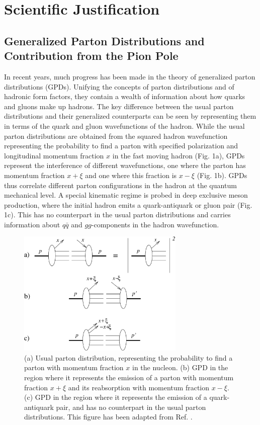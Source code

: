 \section{Scientific Justification}


\subsection{Generalized Parton Distributions and Contribution from the Pion
  Pole}

In recent years, much progress has been made in the theory of generalized
parton distributions (GPDs).  Unifying the concepts of parton distributions and
of hadronic form factors, they contain a wealth of information about how quarks
and gluons make up hadrons. The key difference between the usual parton
distributions and their generalized counterparts can be seen by representing
them in terms of the quark and gluon wavefunctions of the hadron.  While the
usual parton distributions are obtained from the squared hadron wavefunction
representing the probability to find a parton with specified polarization and
longitudinal momentum fraction $x$ in the fast moving hadron (Fig. 1a), GPDs
represent the interference of different wavefunctions, one where the parton has
momentum fraction $x+\xi$ and one where this fraction is $x-\xi$ (Fig. 1b).
GPDs thus correlate different parton configurations in the hadron at the
quantum mechanical level.  A special kinematic regime is probed in deep
exclusive meson production, where the initial hadron emits a quark-antiquark or
gluon pair (Fig. 1c).  This has no counterpart in the usual parton
distributions and carries information about $q\bar{q}$ and $gg$-components in
the hadron wavefunction.

\begin{figure}[hbtp!]
\begin{center}
\includegraphics[height=6cm]{./figures/pdist_gpd_comparo.pdf}
\end{center}
\caption{\label{fig:pdis_gpd_comparo}
(a) Usual parton distribution, representing the probability to find a parton
with momentum fraction $x$ in the nucleon.
(b) GPD in the region where it represents the emission of a parton with
momentum fraction $x+\xi$ and its reabsorption with momentum fraction $x-\xi$.
(c) GPD in the region where it represents the emission of a quark-antiquark
pair, and has no counterpart in the usual parton distributions.
This figure has been adapted from Ref. \cite{Di00}.
}
\end{figure}

